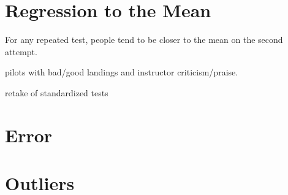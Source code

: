 \documentclass[landscape]{exam}
\begin{document}
  \section{Regression to the Mean}
  For any repeated test, people tend to be closer to the mean on the second attempt.

  \begin{itemize*}
    \item pilots with bad/good landings and instructor criticism/praise.
    \item retake of standardized tests
  \end{itemize*}

  \section{Error}

  \section{Outliers}
\end{document}
